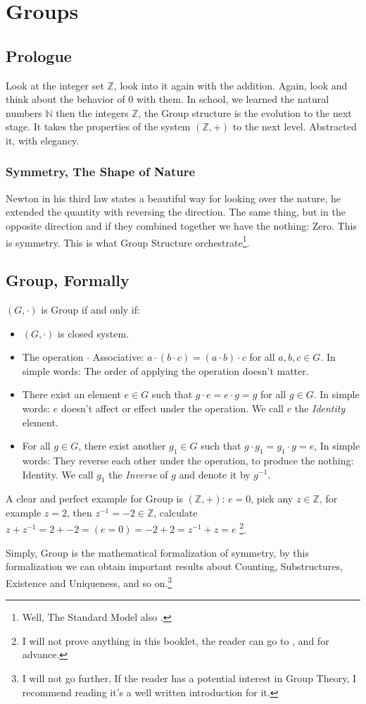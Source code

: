 \section{Groups \label{group}}
\subsection{Prologue}
Look at the integer set $\mathbb{Z}$, look into it again with the addition. Again, look and think about the behavior of $0$ with them. In school, we learned the natural numbers $\mathbb{N}$ then the integers $\mathbb{Z}$, the Group structure is the evolution to the next stage. It takes the properties of the system $(\mathbb{Z},+)$ to the next level. Abstracted it, with elegancy.

\subsubsection{Symmetry, The Shape of Nature}
Newton in his third law states a beautiful way for looking over the nature, he extended the quantity with reversing the direction. The same thing, but in the opposite direction and if they combined together we have the nothing: Zero. This is symmetry. This is what Group Structure orchestrate\footnote{Well, The Standard Model also \cite{enwiki:1038581383}.}.

\subsection{Group, Formally}

$(G,\cdot)$ is Group if and only if:
\begin{itemize}
   \item $(G,\cdot)$ is closed system.
   \item The operation $\cdot$ Associative: $a \cdot (b \cdot c) = (a \cdot b) \cdot c$ for all $a,b,c \in G$. In simple words: The order of applying the operation doesn't matter.
   \item There exist an element $e \in G$ such that $g \cdot e = e \cdot g = g$ for all $g \in G$. In simple words: $e$ doesn't affect or effect under the operation. We call $e$ the {\it Identity} element.
   \item For all $g \in G$, there exist another $g_1 \in G$ such that $g \cdot g_1 = g_1 \cdot g = e$, In simple words: They reverse each other under the operation, to produce the nothing: Identity. We call $g_1$ the {\it Inverse} of $g$ and denote it by $g^{-1}$.
\end{itemize}
A clear and perfect example for Group is $(\mathbb{Z},+)$: $e = 0$, pick any $z \in \mathbb{Z}$, for example $z = 2$, then $z^{-1}=-2 \in \mathbb{Z}$, calculate $z + z^{-1} = 2 + -2 = ( e = 0 ) = -2 + 2 = z^{-1} + z = e$ \footnote{I will not prove anything in this booklet, the reader can go to  \cite{fraleigh2003a}, and \cite{beardon2005algebra} for advance.}.

Simply, Group is the mathematical formalization of symmetry, by this formalization we can obtain important results about Counting, Substructures, Existence and Uniqueness, and so on.\footnote{I will not go further, If the reader has a potential interest in Group Theory, I recommend reading \cite{fraleigh2003a} it's a well written introduction for it.}
